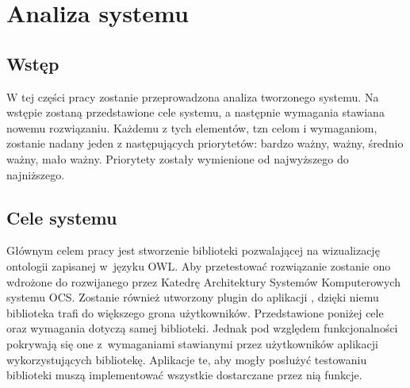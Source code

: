 
\chapter{Analiza systemu}
\section{Wstęp}
W tej części pracy zostanie przeprowadzona analiza tworzonego systemu. Na wstępie zostaną przedstawione cele systemu, 
a następnie wymagania stawiana nowemu rozwiązaniu. Każdemu z tych elementów, tzn celom i wymaganiom, zostanie nadany jeden z następujących priorytetów: 
bardzo ważny, ważny, średnio ważny, mało ważny. Priorytety zostały wymienione od najwyższego do najniższego.  
\section{Cele systemu}


Głównym celem pracy jest stworzenie biblioteki pozwalającej na wizualizację ontologii zapisanej w~języku OWL.
 Aby przetestować rozwiązanie zostanie ono wdrożone do rozwijanego przez Katedrę Architektury Systemów Komputerowych systemu OCS. Zostanie również 
utworzony plugin do aplikacji \protege, dzięki niemu biblioteka trafi do większego grona użytkowników. Przedstawione poniżej cele oraz wymagania dotyczą 
samej biblioteki. Jednak pod względem funkcjonalności pokrywają się one z~wymaganiami stawianymi przez użytkowników aplikacji wykorzystujących bibliotekę. 
Aplikacje te, aby mogły posłużyć testowaniu biblioteki  muszą implementować wszystkie dostarczane przez nią funkcje.  
\par 
 
